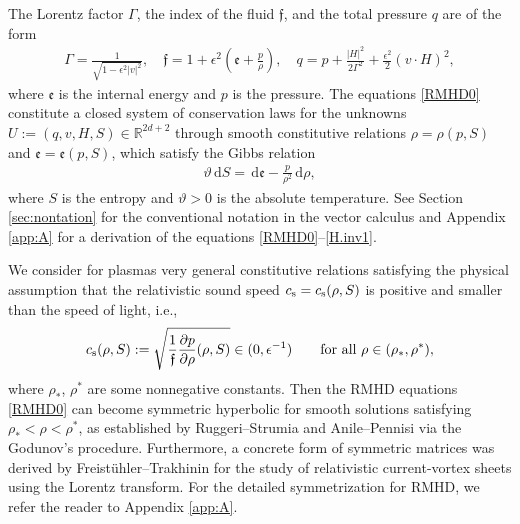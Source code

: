 \documentclass[twoside,11pt]{article}
\numberwithin{equation}{section}
\def\d{\,\mathrm{d}}
\def\p{\partial}
\begin{document}
	The Lorentz factor $\varGamma$, the index of the fluid $\mathfrak{f}$, and the total pressure $q$ are of the form
	\begin{align}  \label{Gamma:def}
		\varGamma=\frac{1}{\sqrt{1-\epsilon^2|v|^2}},\quad
		\mathfrak{f}=1+\epsilon^{2}\left(\mathfrak{e}+\frac{p}{\rho}\right),\quad
		q=p+\frac{|H|^2}{2\varGamma^{2}}+\frac{\epsilon^2}{2} (v\cdot H)^2,
	\end{align}
	where $\mathfrak{e}$ is the internal energy and $p$ is the pressure.
	The equations \eqref{RMHD0} constitute a closed system of conservation laws for the unknowns $U:=(q,v,H,S)\in \mathbb{R}^{2d+2}  $ through smooth constitutive relations $\rho=\rho(p, S)$ and $\mathfrak{e}=\mathfrak{e}(p, S)$, which satisfy the Gibbs relation
	\begin{align} \label{Gibbs}
		\vartheta \d S=\d \mathfrak{e}-\frac{p}{\rho^2} \d \rho,
	\end{align}
	where $S$ is the entropy and $\vartheta>0$ is the absolute temperature.
See Section \ref{sec:nontation} for  the conventional notation in the vector calculus
and Appendix \ref{app:A} for a derivation of the equations \eqref{RMHD0}--\eqref{H.inv1}.

We consider for plasmas very general constitutive relations satisfying the physical assumption that the relativistic sound speed $c_{\rm s}=c_{\rm s}(\rho, S)$ is positive and smaller than the speed of light, i.e.,
\begin{align} \label{cs:def}
	c_{\rm s}(\rho, S):=\sqrt{\frac{1}{\mathfrak{f}}\frac{\p p}{\p \rho} (\rho, S)}\in (0,\epsilon^{-1})
	\qquad \textrm{for all }  \rho \in (\rho_*,\rho^*) ,	
\end{align}
where $\rho_*$, $\rho^*$ are some nonnegative constants.
Then the RMHD equations \eqref{RMHD0} can become symmetric hyperbolic for smooth solutions satisfying $\rho_*<\rho<\rho^*$, as established by {\sc Ruggeri--Strumia} \cite{RS81MR0628566} and {\sc Anile--Pennisi} \cite{A90zbMATH05040442, AP87MR0877994} via the Godunov's procedure.
Furthermore, a concrete form of symmetric matrices was derived by {\sc Freist\"{u}hler--Trakhinin} \cite{FT13MR3044369} for the study of relativistic current-vortex sheets using the Lorentz transform.
For the detailed symmetrization for RMHD, we refer the reader to Appendix \ref{app:A}.
	
\end{document}
